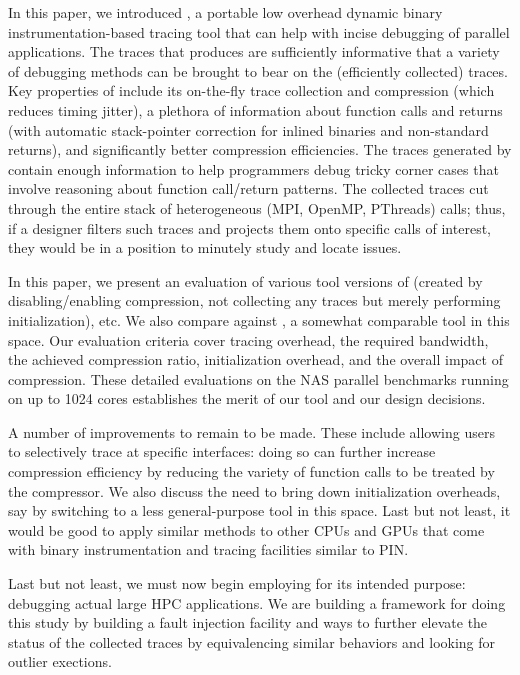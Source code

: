 In this paper, we introduced \parlot, a portable low overhead dynamic
binary instrumentation-based
tracing tool that can help with incise debugging of parallel applications.
%
The traces that \parlot produces are sufficiently informative that
a variety of debugging methods can be brought to bear on the
(efficiently collected) traces.
%
Key properties of \parlot include its on-the-fly trace collection and
compression (which reduces timing jitter), a plethora of information
about function calls and returns (with automatic stack-pointer 
correction for inlined binaries and non-standard returns), and
significantly better compression efficiencies.
%
The traces generated by
\parlot  contain enough information to help programmers debug
tricky corner cases that involve reasoning about function call/return
patterns.
%
The collected traces cut through the entire stack of heterogeneous
(MPI, OpenMP, PThreads) calls; thus, if a designer filters such traces
and projects them onto specific calls of interest, they would be in 
a position to minutely study and locate issues.


In this paper, we present an evaluation of various tool versions of \parlot
(created by disabling/enabling compression, not collecting any traces but
merely performing initialization), etc.
%
We also compare \parlot against \callgrind, a somewhat comparable tool
in this space.
%
Our evaluation criteria cover tracing overhead, the required bandwidth,
the achieved compression ratio, initialization overhead, and the 
overall impact of compression.
%
These detailed evaluations on the NAS parallel benchmarks running on
up to 1024 cores establishes the merit of our tool and our design
decisions.


A number of improvements to \parlot remain to be made.
%
These include allowing users to selectively trace at specific
interfaces: doing so can further increase compression efficiency
by reducing the variety of function calls to be treated by
the compressor.
%
We also discuss the need to bring down initialization overheads, say
by switching to a less general-purpose tool in this space.
%
Last but not least, it would be good to apply similar methods to
other CPUs and GPUs that come with binary instrumentation and tracing
facilities similar to PIN.


Last but not least, we must now begin employing \parlot for its
intended purpose: debugging actual large HPC applications.
%
We are  building a framework for doing this study by building
a fault injection facility and ways to further elevate the
status of the collected traces by equivalencing similar behaviors
and looking for outlier exections.

